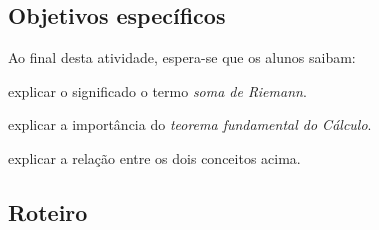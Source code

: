 \documentclass[a4paper,12pt]{scrartcl}
\begin{document}
    \subsection*{Objetivos específicos}
  
    Ao final desta atividade, espera-se que os alunos saibam:
    \begin{compactitem}
      \item explicar o significado o termo \emph{soma de Riemann}.
      \item explicar a importância do \emph{teorema fundamental do Cálculo}.
      \item explicar a relação entre os dois conceitos acima.
    \end{compactitem}
  
    \subsection*{Roteiro}
  
\end{document}
